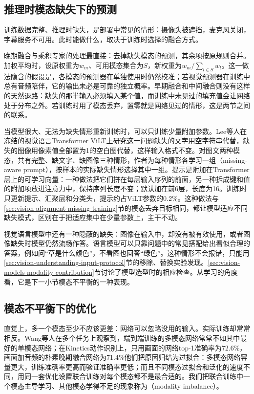\subsection{推理时模态缺失下的预测}
\label{sec:vision-alignment-missing-inference}

训练数据完整、推理时缺失，是部署中常见的情形：摄像头被遮挡，麦克风关闭，字幕服务不可用。此时能做什么，取决于训练时选择的融合方式。

晚期融合与乘积专家的处理最直接：去掉缺失模态的预测，其余项按原规则合并。加权平均时，设原权重为$w_m$、可用模态集合为$S$，新权重为$w_m/\sum_{l\in S}w_l$。这一做法隐含的假设是，各模态的预测器在单独使用时仍然校准；若视觉预测器在训练中总有音频陪伴，它的输出未必是可靠的独立概率。早期融合和中间融合则没有这样的天然退路：缺失的那半输入必须填入某个值，而训练中未见过的填充值会让网络处于分布之外。若训练时用了模态丢弃，置零就是网络见过的情形，这是两节之间的联系。

当模型很大、无法为缺失情形重新训练时，可以只训练少量附加参数。Lee等人在冻结的视觉语言Transformer ViLT上研究这一问题缺失的文字用空字符串代替，缺失的图像用像素值全部置为1的空白图代替，这样输入格式不变。对图文两种模态，共有完整、缺文字、缺图像三种情形，作者为每种情形各学习一组（missing-aware prompt），按样本的实际缺失情形选择其中一组。提示是附加在Transformer层上的可学习向量：一种做法把它们拼在每层输入序列的前面，另一种拆成键和值的附加项放进注意力中，保持序列长度不变；默认加在前6层，长度为16。训练时只更新提示、汇聚层和分类头，提示约占ViLT参数的0.2\%。这种做法与\ref{sec:vision-alignment-missing-training}节的模态丢弃目标相同，都让模型适应不同缺失模式，区别在于把适应集中在少量参数上，主干不动。

视觉语言模型中还有一种隐蔽的缺失：图像在输入中，却没有被有效使用，或者图像缺失时模型仍然流畅作答。语言模型可以只靠问题中的常见搭配给出看似合理的答案，例如问“草是什么颜色”，不看图也回答“绿色”。这种情形不会报错，只能用\ref{sec:vision-understanding-input-protocol}节的移除、替换实验发现。\ref{sec:vision-models-modality-contribution}节讨论了模型选型时的相应检查。从学习的角度看，它是下一小节模态不平衡的一种表现。

\subsection{模态不平衡下的优化}
\label{sec:vision-alignment-imbalance}

直觉上，多一个模态至少不应该更差：网络可以忽略没用的输入。实际训练却常常相反。Wang等人在多个任务上观察到，端到端训练的多模态网络常常不如其中最好的单模态网络；在Kinetics动作识别上，只用画面的网络top-1准确率为72.6\%，画面加音频的朴素晚期融合网络为71.4\%他们把原因归结为过拟合：多模态网络容量更大，训练准确率更高而验证准确率更低；而且不同模态过拟合和泛化的速度不同，用同一套优化设置联合训练对每个模态都不是最合适的。我们把联合训练中一个模态主导学习、其他模态学得不足的现象称为（modality imbalance）。

